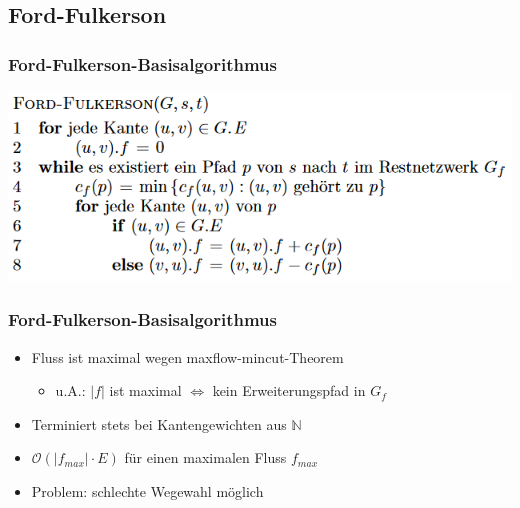 \documentclass[draft]{beamer}
\newcommand{\ff}{Ford-Fulkerson}
\begin{document}
\subsection{Ford-Fulkerson}
\begin{frame}
\frametitle{\ff-Basisalgorithmus}
\begin{adjustbox}{width = \textwidth}
\includegraphics{../Grafiken/FF-Basis.png}
\end{adjustbox}
\end{frame}

\begin{frame}
\frametitle{\ff-Basisalgorithmus}
\begin{itemize}
\item Fluss ist maximal wegen maxflow-mincut-Theorem \begin{itemize}
\item u.A.: $\lvert f\rvert$ ist maximal $\Leftrightarrow$ kein Erweiterungspfad in $G_{f}$
\end{itemize}
\item Terminiert stets bei Kantengewichten aus $\mathbb{N}$
\item $\mathcal{O}(\lvert f_{max}\rvert \cdot E)$ für einen maximalen Fluss $f_{max}$
\item Problem: schlechte Wegewahl möglich
\end{itemize}
\end{frame}
\end{document}
